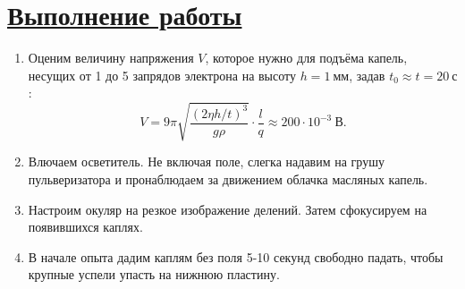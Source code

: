 \documentclass[a4paper,12pt]{article} %
\begin{document}
\section*{\underline{\textbf{Выполнение работы}}}
\begin{enumerate}
	\item Оценим величину напряжения $V$, которое нужно для подъёма капель, несущих от 1 до 5 запрядов электрона на высоту $h = 1~\text{мм}$, задав $t_0 \approx t = 20~\text{с}$:
	$$
	V =  9\pi \sqrt{\dfrac{(2\eta h/t)^3}{g\rho}}\cdot \dfrac{l}{q} \approx 200 \cdot 10^{-3}~\text{В}.
	$$
	\item Влючаем осветитель. Не включая поле, слегка надавим на грушу пульверизатора и пронаблюдаем за движением облачка масляных капель.
	\item Настроим окуляр на резкое изображение делений. Затем сфокусируем на появившихся каплях.
	\item В начале опыта дадим каплям без поля 5-10 секунд свободно падать, чтобы крупные успели упасть на нижнюю пластину.\\
\end{enumerate}
\newpage
\end{document}
